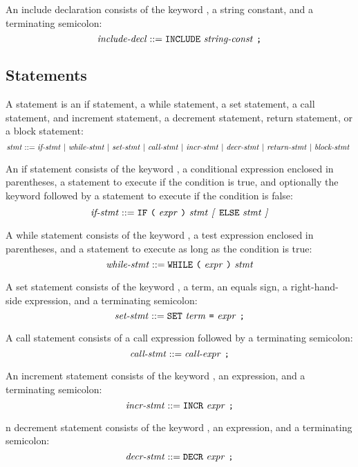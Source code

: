 \documentclass[10pt]{article}
\begin{document}
 An include declaration consists of the
keyword , a string constant, and a terminating semicolon:
%
$$\mbox{\textit{include-decl}} ::= \mbox{\texttt{INCLUDE}
  \ensuremath{\mbox{\textit{string-const}}} \texttt{;}}$$

\subsection{Statements}
\label{sec:syntax:statements}

A statement is an if statement, a while statement, a set statement, a
call statement, and increment statement, a decrement statement, return
statement, or a block statement:
%
$$\mbox{\textit{stmt}} ::= \mbox{\ensuremath{\mbox{\textit{if-stmt}}} $|$ \ensuremath{\mbox{\textit{while-stmt}}}
  $|$ \ensuremath{\mbox{\textit{set-stmt}}} $|$ \ensuremath{\mbox{\textit{call-stmt}}} $|$
  \ensuremath{\mbox{\textit{incr-stmt}}} $|$ \ensuremath{\mbox{\textit{decr-stmt}}} $|$
  \ensuremath{\mbox{\textit{return-stmt}}} $|$ \ensuremath{\mbox{\textit{block-stmt}}} }$$

 An if statement consists of the keyword
, a conditional expression enclosed in parentheses, a
statement to execute if the condition is true, and optionally the
keyword  followed by a statement to execute if the condition
is false:
%
$$\mbox{\textit{if-stmt}} ::= \mbox{\texttt{IF} \texttt{(} \ensuremath{\mbox{\textit{expr}}} \texttt{)}
  \ensuremath{\mbox{\textit{stmt}}} \textit{[} \texttt{ELSE} \ensuremath{\mbox{\textit{stmt}}} \textit{]}}$$

 A while statement consists of the keyword
, a test expression enclosed in parentheses, and a
statement to execute as long as the condition is true:
%
$$\mbox{\textit{while-stmt}} ::= \mbox{\texttt{WHILE} \texttt{(} \ensuremath{\mbox{\textit{expr}}}
  \texttt{)} \ensuremath{\mbox{\textit{stmt}}}}$$

 A set statement consists of the keyword
, a term, an equals sign, a right-hand-side expression, and a
terminating semicolon:
%
$$\mbox{\textit{set-stmt}} ::= \mbox{\texttt{SET} \ensuremath{\mbox{\textit{term}}} \texttt{=}
  \ensuremath{\mbox{\textit{expr}}} \texttt{;}}$$

 A call statement consists of a call
expression followed by a terminating semicolon:
%
$$\mbox{\textit{call-stmt}} ::= \mbox{\ensuremath{\mbox{\textit{call-expr}}} \texttt{;}}$$

 An increment statement consists of the
keyword , an expression, and a terminating semicolon:
%
$$\mbox{\textit{incr-stmt}} ::= \mbox{\texttt{INCR} \ensuremath{\mbox{\textit{expr}}} \texttt{;}}$$

 n decrement statement consists of the
keyword , an expression, and a terminating semicolon:
%
$$\mbox{\textit{decr-stmt}} ::= \mbox{\texttt{DECR} \ensuremath{\mbox{\textit{expr}}} \texttt{;}}$$
\end{document}
